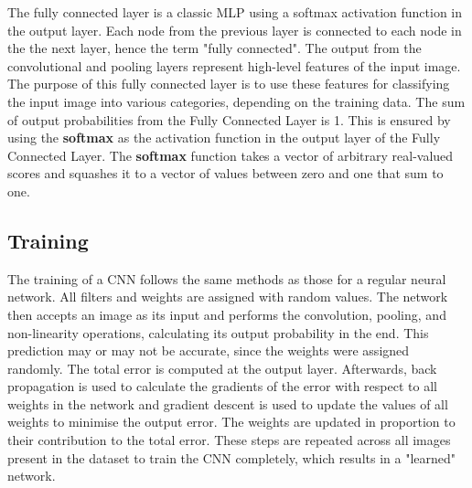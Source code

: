 The fully connected layer is a classic \ac{MLP} using a softmax activation function in the output layer. Each node from the previous layer is connected to each node in the the next layer, hence the term "fully connected".\newline\newline
The output from the convolutional and pooling layers represent high-level features of the input image. The purpose of this fully connected layer is to use these features for classifying the input image into various categories, depending on the training data. \newline\newline
The sum of output probabilities from the Fully Connected Layer is 1. This is ensured by using the \textbf{softmax} as the activation function in the output layer of the Fully Connected Layer. The \textbf{softmax} function takes a vector of arbitrary real-valued scores and squashes it to a vector of values between zero and one that sum to one.

\subsection*{Training}
\label{sect5_1_2_1b}
The training of a CNN follows the same methods as those for a regular neural network. All filters and weights are assigned with random values. The network then accepts an image as its input and performs the convolution, pooling, and non-linearity operations, calculating its output probability in the end. This prediction may or may not be accurate, since the weights were assigned randomly.\newline\newline
The total error is computed at the output layer. Afterwards, back propagation is used to calculate the gradients of the error with respect to all weights in the network and gradient descent is used to update the values of all weights to minimise the output error. The weights are updated in proportion to their contribution to the total error. \newline\newline
These steps are repeated across all images present in the dataset to train the CNN completely, which results in a "learned" network. 
